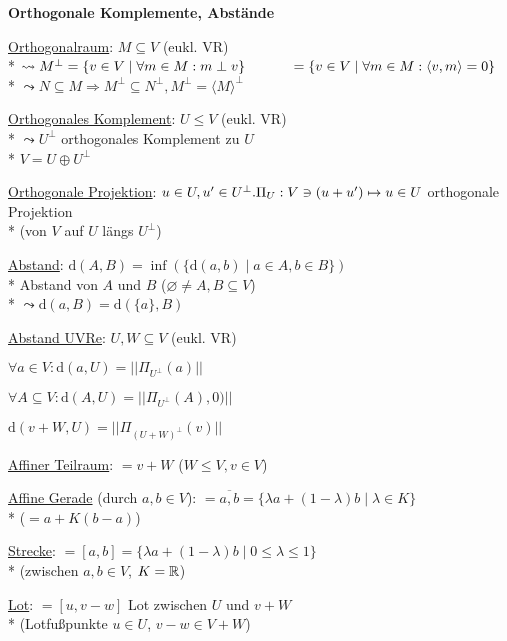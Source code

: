 \textbf{Orthogonale Komplemente, Abstände}
\begin{items}
	\item \underline{Orthogonalraum}: \( M \subseteq V \) (eukl. VR) \\* \( \leadsto M^\perp = \{ v \in V \mid \forall m \in M: m \perp v \} \\* \phantom{xx  x xx\ } = \{ v \in V \mid \forall m \in M: \langle v,m \rangle = 0 \} \) 
		\\*
		\( \leadsto N \subseteq M \Rightarrow M^\perp \subseteq N^\perp, M^\perp = \langle M \rangle^\perp \)
	\item \underline{Orthogonales Komplement}: \( U \leq V \) (eukl. VR) \\* \( \leadsto U^\perp \) orthogonales Komplement zu \( U \) \\* \( V = U \oplus U^\perp \)
	\item \underline{Orthogonale Projektion}: \( u \in U, u' \in U^\perp. \\* \Pi_U: V \ni (u+u') \mapsto u \in U \) orthogonale Projektion \\* (von \( V \) auf \( U \) längs \( U^\perp \))
	\item \underline{Abstand}: \( \text{d}(A,B) = \inf(\{ \text{d}(a,b) \mid a \in A, b \in B \}) \)
		\\*
		Abstand von \( A \) und \( B \) (\( \varnothing \neq A,B \subseteq V \))
		\\*
		\( \leadsto \text{d}(a,B) = \text{d}(\{ a \}, B) \)
	\item \underline{Abstand UVRe}: \( U,W \subseteq V \) (eukl. VR)
		\begin{enumeration}
			\item \( \forall a \in V: \text{d}(a,U) = || \Pi_{U^\perp}(a) || \)
			\item \( \forall A \subseteq V: \text{d}(A,U) = || \Pi_{U^\perp}(A),0) || \)
			\item \( \text{d}(v+W, U) = || \Pi_{(U+W)^\perp}(v) || \)
		\end{enumeration}

	\item \underline{Affiner Teilraum}: \( = v+W \) (\( W \leq V, v \in V \))
	\item \underline{Affine Gerade} (durch \( a,b \in V \)): \( = \overline{a,b} = \{ \lambda a + (1-\lambda)b \mid \lambda \in K \} \) \\* (\( = a + K(b-a) \))
	\item \underline{Strecke}: \( = [a,b] = \{ \lambda a + (1 - \lambda)b \mid 0 \leq \lambda \leq 1 \} \) \\* (zwischen \( a,b \in V \), \( K = \mathbb{R} \))
	\item \underline{Lot}: \( = [u,v-w] \) Lot zwischen \( U \) und \( v+W \) \\* (Lotfußpunkte \( u \in U \), \( v-w \in V+W \))
\end{items}